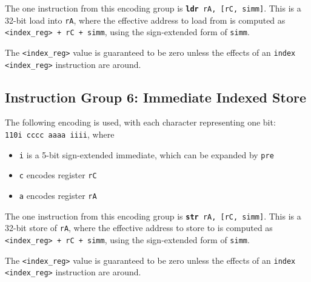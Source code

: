 \documentclass{article}
\begin{document}
	The one instruction from this encoding group is
	\texttt{\textbf{ldr} rA, [rC, simm]}.
	This is a 32-bit load into \texttt{rA}, where the effective address to
	load from is computed as \texttt{<index\_reg> + rC + simm}, using the
	sign-extended form of \texttt{simm}.

	The \texttt{<index\_reg>} value is guaranteed to be zero unless the
	effects of an \texttt{index <index\_reg>} instruction are around.


	\subsection{Instruction Group 6:  Immediate Indexed Store}
	The following encoding is used, with each character representing one
	bit:  \\
	\texttt{110i cccc aaaa iiii}, where

	\singlespacing
	\begin{itemize}
		\item \texttt{i} is a 5-bit sign-extended immediate, which can
		be expanded by \texttt{pre}  
		\item \texttt{c} encodes register \texttt{rC}
		\item \texttt{a} encodes register \texttt{rA}
	\end{itemize}
	\doublespacing

	The one instruction from this encoding group is
	\texttt{\textbf{str} rA, [rC, simm]}.
	This is a 32-bit store of \texttt{rA}, where the effective address to
	store to is computed as \texttt{<index\_reg> + rC + simm}, using the
	sign-extended form of \texttt{simm}.

	The \texttt{<index\_reg>} value is guaranteed to be zero unless the
	effects of an \texttt{index <index\_reg>} instruction are around.


\end{document}
